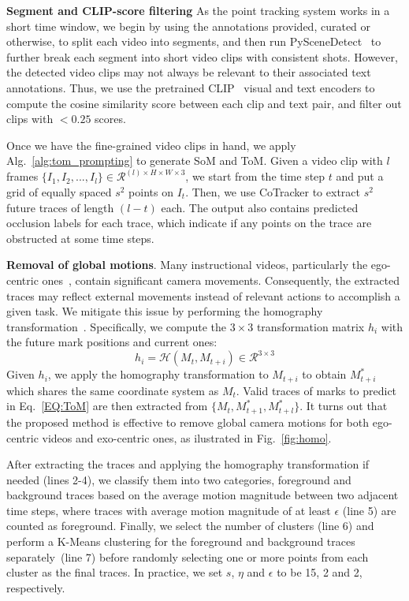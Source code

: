 \noindent\textbf{Segment and CLIP-score filtering} As the point tracking system works in a short time window, we begin by using the annotations provided, curated or otherwise, to split each video into segments, and then run PySceneDetect~\cite{PySceneDetect} to further break each segment into short video clips with consistent shots. However, the detected video clips may not always be relevant to their associated text annotations. Thus, we use the pretrained CLIP~\cite{radford2021learning} visual and text encoders to compute the cosine similarity score between each clip and text pair, and filter out clips with $<0.25$ scores.



Once we have the fine-grained video clips in hand, we apply Alg.~\ref{alg:tom_prompting} to generate SoM and ToM. Given a video clip with $l$ frames $\{I_1,I_{2},...,I_{l}\} \in \mathcal{R}^{(l) \times H\times W \times 3}$, we start from the time step $t$  and put a grid of equally spaced $s^2$ points on $I_t$. Then, we use CoTracker to extract $s^2$ future traces of length $(l-t)$ each. The output also contains predicted occlusion labels for each trace, which indicate if any points on the trace are obstructed at some time steps. 

\noindent\textbf{Removal of global motions}. Many instructional videos, particularly the ego-centric ones~\cite{grauman2022ego4dworld3000hours}, contain significant camera movements. Consequently, the extracted traces may reflect external movements instead of relevant actions to accomplish a given task. We mitigate this issue by performing the homography transformation~\cite{dubrofsky2009homography}. Specifically, we compute the $3\times 3$ transformation matrix $h_i$ with the future mark positions and current ones:
\begin{equation}
    h_i = \mathcal{H}({M}_t, {M}_{t+i}) \in \mathcal{R}^{3\times 3}
\end{equation}
Given $h_i$, we apply the homography transformation to $M_{t+i}$ to obtain $M^*_{t+i}$ which shares the same coordinate system as $M_{t}$. Valid traces of marks to predict in Eq.~\eqref{EQ:ToM} are then extracted from $\{M_{t}, M^*_{t+1}, M^*_{t+l}\}$. It turns out that the proposed method is effective to remove global camera motions for both ego-centric videos and exo-centric ones, as ilustrated in Fig.~\ref{fig:homo}.

After extracting the traces and applying the homography transformation if needed (lines 2-4), we classify them into two categories, foreground and background traces based on the average motion magnitude between two adjacent time steps, where traces with average motion magnitude of at least $\epsilon$ (line 5) are counted as foreground. Finally, we select the number of clusters (line 6) and perform a K-Means clustering for the foreground and background traces separately~(line 7) before randomly selecting one or more points from each cluster as the final traces. In practice, we set $s$, $\eta$ and $\epsilon$ to be 15, 2 and 2, respectively.

